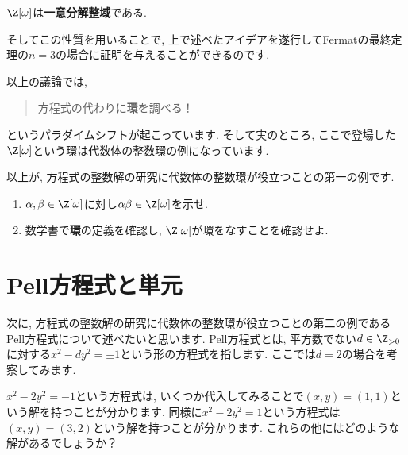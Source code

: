 \documentclass[11pt,b5paper,oneside,titlepage,lualatex]{ltjsreport}
\begin{document}
\begin{theorem}{\cite[定理8.6.1]{Yukie1}}{}
	$ \Z[\omega] $は\textbf{一意分解整域}である.
\end{theorem}

そしてこの性質を用いることで, 上で述べたアイデアを遂行してFermatの最終定理の$ n=3 $の場合に証明を与えることができるのです. 

以上の議論では, 
\begin{quote}
	\centering
	方程式の代わりに\textbf{環}を調べる！
\end{quote}
というパラダイムシフトが起こっています. 
そして実のところ, ここで登場した$ \Z[\omega] $という環は代数体の整数環の例になっています. 

以上が, 方程式の整数解の研究に代数体の整数環が役立つことの第一の例です. 

\begin{exercise}{}{}
	\begin{enumerate}
		\item $ \alpha, \beta \in \Z[\omega] $に対し$ \alpha \beta \in \Z[\omega] $を示せ. 
		\item 数学書で\textbf{環}の定義を確認し, $ \Z[\omega] $が環をなすことを確認せよ. 
	\end{enumerate}
\end{exercise}


\section{Pell方程式と単元} \label{sec:Pell方程式と単元}


次に, 方程式の整数解の研究に代数体の整数環が役立つことの第二の例であるPell方程式について述べたいと思います. 
Pell方程式とは, 平方数でない$ d \in \Z_{>0} $に対する$ x^2 - dy^2 = \pm 1 $という形の方程式を指します. 
ここでは$ d = 2 $の場合を考察してみます. 

$ x^2 - 2y^2 = -1 $という方程式は, いくつか代入してみることで$ (x, y) = (1, 1) $という解を持つことが分かります. 
同様に$ x^2 - 2y^2 = 1 $という方程式は$ (x, y) = (3, 2) $という解を持つことが分かります. 
これらの他にはどのような解があるでしょうか？
\end{document}
